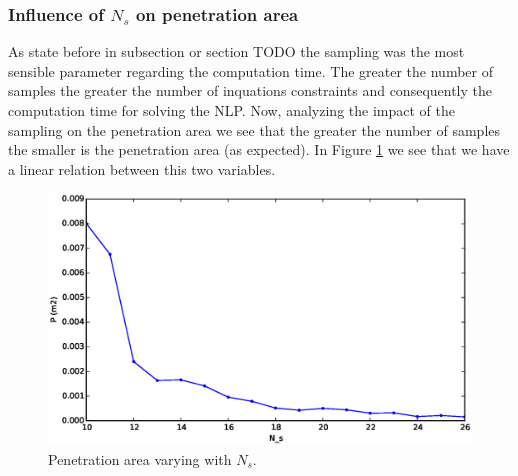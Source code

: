 \subsubsection{Influence of $N_s$ on penetration area}

As state before in subsection or section TODO the sampling was the most sensible parameter regarding the computation time. The greater the number of samples the greater the number of inquations constraints and consequently the computation time for solving the NLP. Now, analyzing the impact of the sampling on the penetration area we see that the greater the number of samples the smaller is the penetration area (as expected). In Figure \ref{fig:ns-pen} we see that we have a linear relation between this two variables.

 \begin{figure}[!h]
 	\centering
 	\includegraphics[width=.6\textwidth]{./img/penetration/pen-nsi.eps}
 	\caption{Penetration area varying with $N_s$.\label{fig:ns-pen}}
 \end{figure}

%
